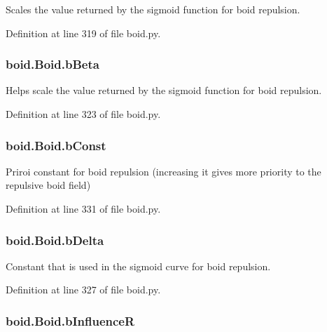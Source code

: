 Scales the value returned by the sigmoid function for boid repulsion. 



Definition at line 319 of file boid.\-py.

\hypertarget{classboid_1_1Boid_a1a48be012c505eea2e1b9f110d9bd5f3}{
\subsubsection[{b\-Beta}]{\setlength{\rightskip}{0pt plus 5cm}boid.\-Boid.\-b\-Beta}}\label{classboid_1_1Boid_a1a48be012c505eea2e1b9f110d9bd5f3}


Helps scale the value returned by the sigmoid function for boid repulsion. 



Definition at line 323 of file boid.\-py.

\hypertarget{classboid_1_1Boid_a868b1d8e6fadd2b1beedc1a9f23edde5}{
\subsubsection[{b\-Const}]{\setlength{\rightskip}{0pt plus 5cm}boid.\-Boid.\-b\-Const}}\label{classboid_1_1Boid_a868b1d8e6fadd2b1beedc1a9f23edde5}


Priroi constant for boid repulsion (increasing it gives more priority to the repulsive boid field) 



Definition at line 331 of file boid.\-py.

\hypertarget{classboid_1_1Boid_afebd87123c129406ee9e8c99f85f66a7}{
\subsubsection[{b\-Delta}]{\setlength{\rightskip}{0pt plus 5cm}boid.\-Boid.\-b\-Delta}}\label{classboid_1_1Boid_afebd87123c129406ee9e8c99f85f66a7}


Constant that is used in the sigmoid curve for boid repulsion. 



Definition at line 327 of file boid.\-py.

\hypertarget{classboid_1_1Boid_ae1a1d62fdc0e9014df5fcb1a49d37342}{
\subsubsection[{b\-Influence\-R}]{\setlength{\rightskip}{0pt plus 5cm}boid.\-Boid.\-b\-Influence\-R}}\label{classboid_1_1Boid_ae1a1d62fdc0e9014df5fcb1a49d37342}


